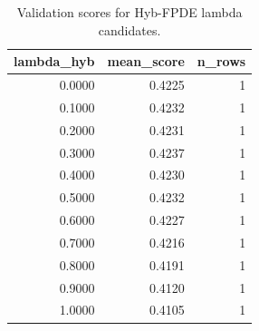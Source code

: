 \begin{table}[t]
\caption{Validation scores for Hyb-FPDE lambda candidates.}
\label{tab:lambda_distribution_computed}
\centering
\begin{tabular}{rrr}
\toprule
lambda\_hyb & mean\_score & n\_rows \\
\midrule
0.0000 & 0.4225 & 1 \\
0.1000 & 0.4232 & 1 \\
0.2000 & 0.4231 & 1 \\
0.3000 & 0.4237 & 1 \\
0.4000 & 0.4230 & 1 \\
0.5000 & 0.4232 & 1 \\
0.6000 & 0.4227 & 1 \\
0.7000 & 0.4216 & 1 \\
0.8000 & 0.4191 & 1 \\
0.9000 & 0.4120 & 1 \\
1.0000 & 0.4105 & 1 \\
\bottomrule
\end{tabular}

\end{table}
